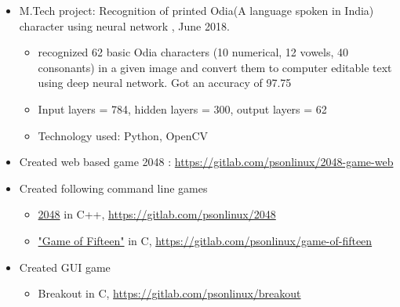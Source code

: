 \documentclass[a4paper,10pt]{article}
\begin{document}
\begin{itemize}
				\item M.Tech project: Recognition of printed Odia(A language spoken in India) character using neural network , June 2018.
				\begin{itemize}
				    \item recognized 62 basic Odia characters (10 numerical, 12 vowels, 40 consonants) in a given image and convert them to computer editable text using deep neural network. Got an accuracy of 97.75
				    \item Input layers = 784, hidden layers = 300, output layers = 62
				    \item Technology used: Python, OpenCV
				\end{itemize}
				
                			\item Created web based game 2048 : \url{https://gitlab.com/psonlinux/2048-game-web}
				\item Created following command line games
				    \begin{itemize}
				        \item \href{https://en.wikipedia.org/wiki/2048_(video_game)}{2048} in C++, \url{https://gitlab.com/psonlinux/2048}
				        \item \href{https://en.wikipedia.org/wiki/15_puzzle}{"Game of Fifteen"} in C, \url{https://gitlab.com/psonlinux/game-of-fifteen}
				    \end{itemize}
				\item Created GUI game
				    \begin{itemize}
				        \item Breakout in C, \url{https://gitlab.com/psonlinux/breakout}
				    \end{itemize}
			\end{itemize}
			
\end{document}
